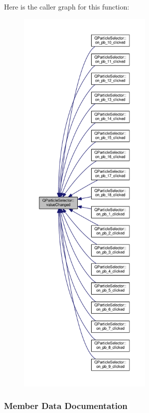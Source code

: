 Here is the caller graph for this function\+:
\nopagebreak
\begin{figure}[H]
\begin{center}
\leavevmode
\includegraphics[height=550pt]{class_q_particle_selector_ac9562cf3ebd13e54ff69ac6cd5e53c6d_icgraph}
\end{center}
\end{figure}




\subsubsection{Member Data Documentation}
\hypertarget{class_q_particle_selector_ad3396ef1085219165de749b7e1cbcebd}{}

